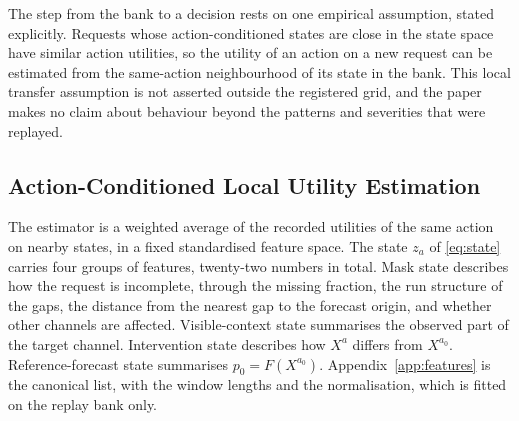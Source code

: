 \documentclass{article}
\begin{document}
The step from the bank to a decision rests on one empirical assumption, stated explicitly.
Requests whose action-conditioned states are close in the state space have similar action
utilities, so the utility of an action on a new request can be estimated from the same-action
neighbourhood of its state in the bank. This local transfer assumption is not asserted outside
the registered grid, and the paper makes no claim about behaviour beyond the patterns and
severities that were replayed.

\subsection{Action-Conditioned Local Utility Estimation}
\label{sec:method-scoring}
The estimator is a weighted average of the recorded utilities of the same action on nearby
states, in a fixed standardised feature space. The state $z_a$ of \eqref{eq:state} carries
four groups of features, twenty-two numbers in total. Mask state describes how the request is
incomplete, through the missing fraction, the run structure of the gaps, the distance from the
nearest gap to the forecast origin, and whether other channels are affected. Visible-context
state summarises the observed part of the target channel. Intervention state describes how
$X^{a}$ differs from $X^{a_0}$. Reference-forecast state summarises $p_0 = F(X^{a_0})$.
Appendix~\ref{app:features} is the canonical list, with the window lengths and the
normalisation, which is fitted on the replay bank only.
\end{document}
